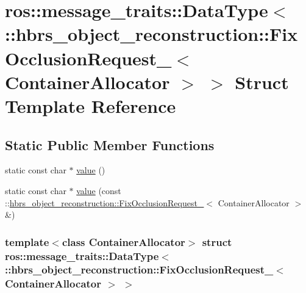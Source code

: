 \hypertarget{structros_1_1message__traits_1_1_data_type_3_01_1_1hbrs__object__reconstruction_1_1_fix_occlusio4406aa34c4519e45ff82ddeab7a3c23e}{\section{ros\-:\-:message\-\_\-traits\-:\-:\-Data\-Type$<$ \-:\-:hbrs\-\_\-object\-\_\-reconstruction\-:\-:\-Fix\-Occlusion\-Request\-\_\-$<$ \-Container\-Allocator $>$ $>$ \-Struct \-Template \-Reference}
\label{structros_1_1message__traits_1_1_data_type_3_01_1_1hbrs__object__reconstruction_1_1_fix_occlusio4406aa34c4519e45ff82ddeab7a3c23e}
}
\subsection*{\-Static \-Public \-Member \-Functions}
\begin{DoxyCompactItemize}
\item 
static const char $\ast$ \hyperlink{structros_1_1message__traits_1_1_data_type_3_01_1_1hbrs__object__reconstruction_1_1_fix_occlusio4406aa34c4519e45ff82ddeab7a3c23e_a3cdb622ccb1d12277fb72425b82e13c0}{value} ()
\item 
static const char $\ast$ \hyperlink{structros_1_1message__traits_1_1_data_type_3_01_1_1hbrs__object__reconstruction_1_1_fix_occlusio4406aa34c4519e45ff82ddeab7a3c23e_a78a8d98a350dfc681ee91d823cbdaa60}{value} (const \-::\hyperlink{structhbrs__object__reconstruction_1_1_fix_occlusion_request__}{hbrs\-\_\-object\-\_\-reconstruction\-::\-Fix\-Occlusion\-Request\-\_\-}$<$ \-Container\-Allocator $>$ \&)
\end{DoxyCompactItemize}
\subsubsection*{template$<$class Container\-Allocator$>$ struct ros\-::message\-\_\-traits\-::\-Data\-Type$<$ \-::hbrs\-\_\-object\-\_\-reconstruction\-::\-Fix\-Occlusion\-Request\-\_\-$<$ Container\-Allocator $>$ $>$}



